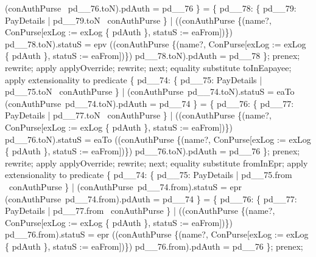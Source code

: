 \begin{LPScript}
\begin{zproof}[lPromotedAuxWorldAbortType]
                        \land (conAuthPurse~ pd\_\_76.toN).pdAuth = pd\_\_76 \} =
                \{ pd\_\_78: \{ pd\_\_79: PayDetails | pd\_\_79.toN \in \dom~conAuthPurse \}
                    |  ((conAuthPurse \oplus \{(name?, \theta ConPurse[exLog := exLog \cup \{ pdAuth \},
                            statuS := eaFrom])\}) pd\_\_78.toN).statuS = epv
                    \land ((conAuthPurse \oplus \{(name?, \theta ConPurse[exLog := exLog \cup \{ pdAuth \},
                            statuS := eaFrom])\}) pd\_\_78.toN).pdAuth = pd\_\_78 \};
            prenex;
            rewrite;
            apply applyOverride;
            rewrite;
        next;
            equality substitute toInEapayee;
            apply extensionality to predicate
                \{ pd\_\_74: \{ pd\_\_75: PayDetails | pd\_\_75.toN \in \dom~conAuthPurse \}
                    |  (conAuthPurse~pd\_\_74.toN).statuS = eaTo
                       \land (conAuthPurse~pd\_\_74.toN).pdAuth = pd\_\_74 \} =
                \{ pd\_\_76: \{ pd\_\_77: PayDetails | pd\_\_77.toN \in \dom~conAuthPurse \}
                    | ((conAuthPurse \oplus \{(name?, \theta ConPurse[exLog := exLog \cup \{ pdAuth \},
                        statuS := eaFrom])\}) pd\_\_76.toN).statuS = eaTo
                    \land ((conAuthPurse \oplus \{(name?, \theta ConPurse[exLog := exLog \cup \{ pdAuth \},
                        statuS := eaFrom])\}) pd\_\_76.toN).pdAuth = pd\_\_76 \};
            prenex;
            rewrite;
            apply applyOverride;
            rewrite;
        next;
            equality substitute fromInEpr;
            apply extensionality to predicate
                \{ pd\_\_74: \{ pd\_\_75: PayDetails | pd\_\_75.from \in \dom~conAuthPurse \}
                    |  (conAuthPurse~pd\_\_74.from).statuS = epr
                       \land (conAuthPurse~pd\_\_74.from).pdAuth = pd\_\_74 \} =
                \{ pd\_\_76: \{ pd\_\_77: PayDetails | pd\_\_77.from \in \dom~conAuthPurse \}
                    | ((conAuthPurse \oplus \{(name?, \theta ConPurse[exLog := exLog \cup \{ pdAuth \},
                        statuS := eaFrom])\}) pd\_\_76.from).statuS = epr
                    \land ((conAuthPurse \oplus \{(name?, \theta ConPurse[exLog := exLog \cup \{ pdAuth \},
                        statuS := eaFrom])\}) pd\_\_76.from).pdAuth = pd\_\_76 \};
            prenex;

\end{zproof}
\end{LPScript}
